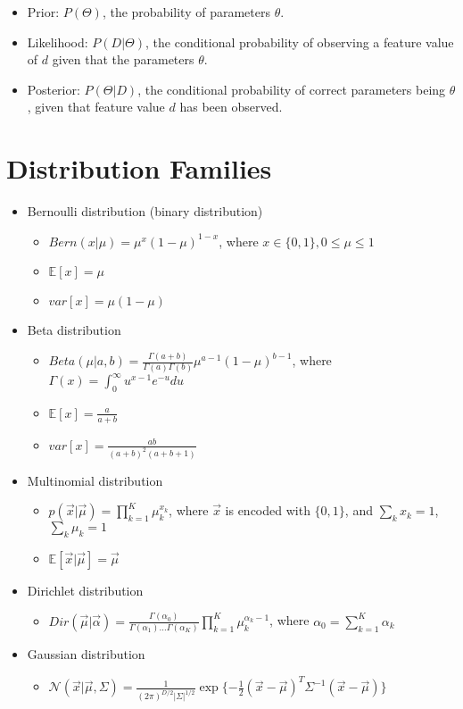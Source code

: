 \documentclass[letterpaper,10pt]{article}
\begin{document}
\begin{itemize}
	\item Prior: $P(\Theta)$, the probability of parameters $\theta$.
	\item Likelihood: $P(D|\Theta)$, the conditional probability of observing a feature value of $d$ given that the parameters $\theta$.
	\item Posterior: $P(\Theta|D)$, the conditional probability of correct parameters being $\theta$, given that feature value $d$ has been observed.
\end{itemize}

\section{Distribution Families}

\begin{itemize}
	\item Bernoulli distribution (binary distribution)
	\begin{itemize}
		\item $Bern(x|\mu)=\mu^x(1-\mu)^{1-x}$, where $x\in\{0,1\}, 0\leq\mu\leq1$
		\item $\mathbb{E}[x]=\mu$
		\item $var[x]=\mu(1-\mu)$
	\end{itemize}
	\item Beta distribution
	\begin{itemize}
		\item $Beta(\mu|a,b)=\frac{\Gamma(a+b)}{\Gamma(a)\Gamma(b)}\mu^{a-1}(1-\mu)^{b-1}$, where $\Gamma(x)=\int_{0}^{\infty}u^{x-1}e^{-u}du$
		\item $\mathbb{E}[x]=\frac{a}{a+b}$
		\item $var[x]=\frac{ab}{(a+b)^2(a+b+1)}$
	\end{itemize}
	\item Multinomial distribution
	\begin{itemize}
		\item $p(\vec{x}|\vec{\mu})=\prod_{k=1}^{K}\mu_k^{x_k}$, where $\vec{x}$ is encoded with $\{0,1\}$, and $\sum_kx_k=1$, $\sum_k\mu_k=1$
		\item $\mathbb{E}[\vec{x}|\vec{\mu}]=\vec{\mu}$
	\end{itemize}
	\item Dirichlet distribution
	\begin{itemize}
		\item $Dir(\vec{\mu}|\vec{\alpha})=\frac{\Gamma(\alpha_0)}{\Gamma(\alpha_1)\dots\Gamma(\alpha_K)}\prod_{k=1}^{K}\mu_k^{\alpha_k-1}$, where $\alpha_0=\sum_{k=1}^{K}\alpha_k$
	\end{itemize}
	\item Gaussian distribution
	\begin{itemize}
		\item $\mathcal{N}(\vec{x}|\vec{\mu},\Sigma)=\frac{1}{(2\pi)^{D/2}|\Sigma|^{1/2}}\exp\{ -\frac{1}{2} (\vec{x}-\vec{\mu})^T \Sigma^{-1} (\vec{x}-\vec{\mu}) \}$
	\end{itemize}
\end{itemize}
\end{document}
